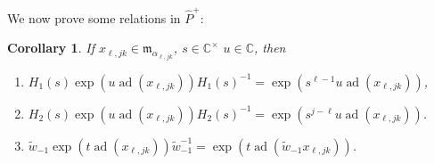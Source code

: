 \documentclass[11pt,letterpaper]{amsart}
\newcounter{thecounter}
\numberwithin{thecounter}{section}
\newtheorem{corollary}[thecounter]{Corollary}
\theoremstyle{definition}
\DeclareMathOperator{\ad}{ad}
\renewcommand{\a}{\alpha}
\newcommand{\C}{{\mathbb C}}
\newcommand{\Php}{{\widehat{P}^+}}
\newcommand{\m}{{\mathfrak{m}}}
\begin{document}
We now prove some relations in $\Php$:%
\begin{corollary}
If $x_{\ell,jk}\in\m_{\a_{\ell,jk}}$, $s\in\C^\times$ $u\in\C$, then
\begin{enumerate}
\item $H_1(s)\exp\left(u\ad\left(x_{\ell,jk}\right)\right)H_1(s)^{-1} = \exp\left(s^{\ell-1}u\ad\left(x_{\ell,jk}\right)\right)$,
\item $H_2(s)\exp\left(u\ad\left(x_{\ell,jk}\right)\right)H_2(s)^{-1} = \exp\left(s^{j-\ell}u\ad\left(x_{\ell,jk}\right)\right)$.
\item $\widetilde{w}_{-1}\exp(t\ad(x_{\ell,jk}))\widetilde{w}_{-1}^{-1} = \exp(t\ad(\widetilde{w}_{-1}x_{\ell,jk}))$.
\end{enumerate}
\end{corollary}
\end{document}
